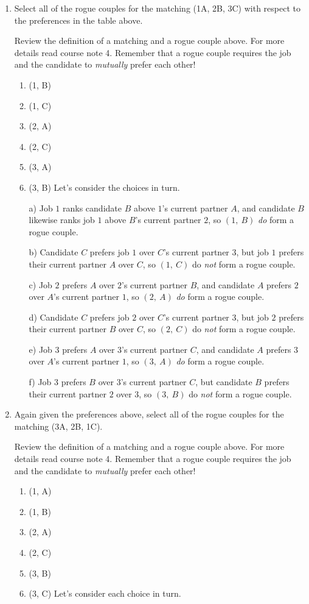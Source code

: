\documentclass[11pt, preview]{standalone} %
\begin{document}
\begin{enumerate}
\item Select all of the rogue couples for the matching (1A, 2B, 3C) with respect to the preferences in the table above.
\begin{Multi}
\Hint Review the definition of a matching and a rogue couple above. For more details read course note 4. Remember that a rogue couple requires the job and the candidate to {\it mutually} prefer each other!
\begin{enumerate}
\TrueChoice\item (1, B)
\FalseChoice\item (1, C)
\TrueChoice\item (2, A)
\FalseChoice\item (2, C)
\TrueChoice\item (3, A)
\FalseChoice\item (3, B)
\Solution Let's consider the choices in turn. 

a) Job $1$ ranks candidate $B$ above $1$'s current partner $A$, and candidate $B$ likewise ranks job $1$ above $B$'s current partner $2$, so $(1,\ B)$ {\it do} form a rogue couple.

b) Candidate $C$ prefers job $1$ over $C$'s current partner $3$, but job $1$ prefers their current partner $A$ over $C$, so $(1,\ C)$ do {\it not} form a rogue couple.

c) Job $2$ prefers $A$ over $2$'s current partner $B$, and candidate $A$ prefers $2$ over $A$'s current partner $1$, so $(2,\ A)$ {\it do} form a rogue couple.

d) Candidate $C$ prefers job $2$ over $C$'s current partner $3$, but job $2$ prefers their current partner $B$ over $C$, so $(2,\ C)$ do {\it not} form a rogue couple.

e) Job $3$ prefers $A$ over $3$'s current partner $C$, and candidate $A$ prefers $3$ over $A$'s current partner $1$, so $(3,\ A)$ {\it do} form a rogue couple.

f) Job $3$ prefers $B$ over $3$'s current partner $C$, but candidate $B$ prefers their current partner $2$ over $3$, so $(3,\ B)$ do {\it not} form a rogue couple.
\end{enumerate}
\end{Multi}
\item Again given the preferences above, select all of the rogue couples for the matching (3A, 2B, 1C).
\begin{Multi}
\Hint Review the definition of a matching and a rogue couple above. For more details read course note 4. Remember that a rogue couple requires the job and the candidate to {\it mutually} prefer each other!
\begin{enumerate}
\FalseChoice\item (1, A)
\TrueChoice\item (1, B)
\FalseChoice\item (2, A)
\FalseChoice\item (2, C)
\FalseChoice\item (3, B)
\FalseChoice\item (3, C)
\Solution Let's consider each choice in turn.


\end{enumerate}
\end{Multi}
\end{enumerate}
\end{document}
